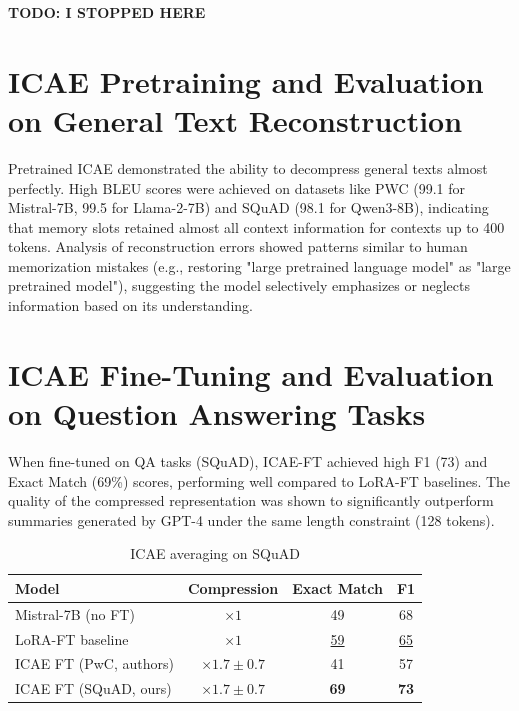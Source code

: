 \textbf{TODO: I STOPPED HERE}

\section{ICAE Pretraining and Evaluation on General Text Reconstruction}

Pretrained ICAE \cite{ge_-context_2024} demonstrated the ability to decompress general texts almost perfectly.
High BLEU scores were achieved on datasets like PWC (99.1 for Mistral-7B, 99.5 for Llama-2-7B) and SQuAD (98.1 for Qwen3-8B), indicating that memory slots retained almost all context information for contexts up to 400 tokens.
Analysis of reconstruction errors showed patterns similar to human memorization mistakes (e.g., restoring "large pretrained language model" as "large pretrained model"), suggesting the model selectively emphasizes or neglects information based on its understanding.


\section{ICAE Fine-Tuning and Evaluation on Question Answering Tasks}

When fine-tuned on QA tasks (SQuAD), ICAE-FT \cite{ge_-context_2024} achieved high F1 (73) and Exact Match (69\%) scores, performing well compared to LoRA-FT baselines.
The quality of the compressed representation was shown to significantly outperform summaries generated by GPT-4 under the same length constraint (128 tokens).

\begin{table}[h]
    \centering
    \begin{tabular}{lccc}
        \toprule
        \textbf{Model} &
        \textbf{Compression} &
        \textbf{Exact Match} &
        \textbf{F1} \\
        \midrule
        Mistral-7B (no FT)          & ×$1$         & 49 & 68 \\
        LoRA-FT baseline            & ×$1$         & \underline{59} & \underline{65} \\
        ICAE FT (PwC, authors)       & ×$1.7\pm0.7$ & 41 & 57 \\
        ICAE FT (SQuAD, ours)              & ×$1.7\pm0.7$ & \textbf{69} & \textbf{73} \\
        \bottomrule
    \end{tabular}
    \caption{ICAE averaging on SQuAD}
    \label{tab:icae_squad}
\end{table}


